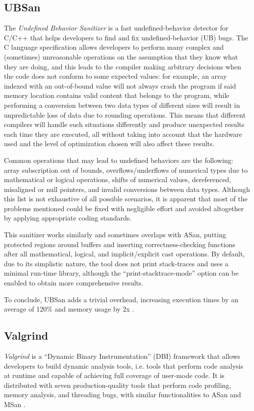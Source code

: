 \subsection{UBSan}
The \textit{Undefined Behavior Sanitizer} \cite{ubsan_docs} is a fast undefined-behavior detector for C/C++ that helps developers to find and fix undefined-behavior (UB) bugs. The C language specification allows developers to perform many complex and (sometimes) unreasonable operations on the assumption that they know what they are doing, and this leads to the compiler making arbitrary decisions when the code does not conform to some expected values: for example, an array indexed with an out-of-bound value will not always crash the program if said memory location contains valid content that belongs to the program, while performing a conversion between two data types of different sizes will result in unpredictable loss of data due to rounding operations. This means that different compilers will handle such situations differently and produce unexpected results each time they are executed, all without taking into account that the hardware used and the level of optimization chosen will also affect these results.

Common operations that may lead to undefined behaviors are the following: array subscription out of bounds, overflows/underflows of numerical types due to mathematical or logical operations, shifts of numerical values, dereferenced, misaligned or null pointers, and invalid conversions between data types. Although this list is not exhaustive of all possible scenarios, it is apparent that most of the problems mentioned could be fixed with negligible effort and avoided altogether by applying appropriate coding standards.  

This sanitizer works similarly and sometimes overlaps with ASan, putting protected regions around buffers and inserting correctness-checking functions after all mathematical, logical, and implicit/explicit cast operations. By default, due to its simplistic nature, the tool does not print stack-traces and uses a minimal run-time library, although the ``print-stacktrace-mode'' option can be enabled to obtain more comprehensive results.

To conclude, UBSan adds a trivial overhead, increasing execution times by an average of 120\% and memory usage by 2x \cite{ubsan_docs}.



\subsection{Valgrind}
\textit{Valgrind} is a ``Dynamic Binary Instrumentation'' (DBI) framework that allows developers to build dynamic analysis tools, i.e. tools that perform code analysis at runtime and capable of achieving full coverage of user-mode code. It is distributed with seven production-quality tools that perform code profiling, memory analysis, and threading bugs, with similar functionalities to ASan and MSan \cite{valgrind_web}.  

